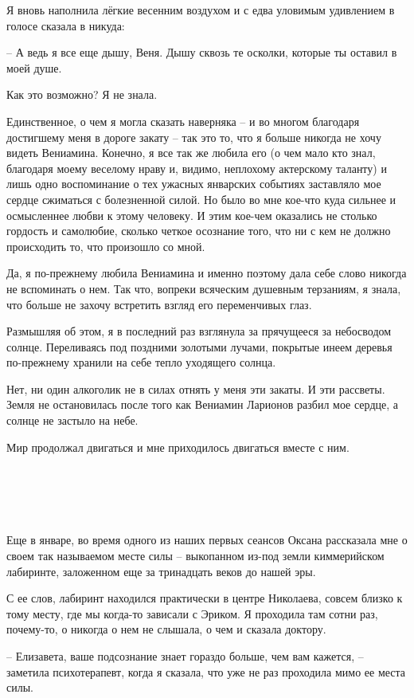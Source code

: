 \documentclass[
]{book}
\begin{document}
Я вновь наполнила лёгкие весенним воздухом и с едва уловимым удивлением в голосе сказала в никуда:

-- А ведь я все еще дышу, Веня. Дышу сквозь те осколки, которые ты оставил в моей душе.

Как это возможно? Я не знала.

Единственное, о чем я могла сказать наверняка -- и во многом благодаря достигшему меня в дороге закату -- так это то, что я больше никогда не хочу видеть Вениамина. Конечно, я все так же любила его (о чем мало кто знал, благодаря моему веселому нраву и, видимо, неплохому актерскому таланту) и лишь одно воспоминание о тех ужасных январских событиях заставляло мое сердце сжиматься с болезненной силой. Но было во мне кое-что куда сильнее и осмысленнее любви к этому человеку. И этим кое-чем оказались не столько гордость и самолюбие, сколько четкое осознание того, что ни с кем не должно происходить то, что произошло со мной.

Да, я по-прежнему любила Вениамина и именно поэтому дала себе слово никогда не вспоминать о нем. Так что, вопреки всяческим душевным терзаниям, я знала, что больше не захочу встретить взгляд его переменчивых глаз.

Размышляя об этом, я в последний раз взглянула за прячущееся за небосводом солнце. Переливаясь под поздними золотыми лучами, покрытые инеем деревья по-прежнему хранили на себе тепло уходящего солнца.

Нет, ни один алкоголик не в силах отнять у меня эти закаты. И эти рассветы. Земля не остановилась после того как Вениамин Ларионов разбил мое сердце, а солнце не застыло на небе.

Мир продолжал двигаться и мне приходилось двигаться вместе с ним.

\hypertarget{chapter-99}{%
\chapter{~}\label{chapter-99}}

Еще в январе, во время одного из наших первых сеансов Оксана рассказала мне о своем так называемом месте силы -- выкопанном из-под земли киммерийском лабиринте, заложенном еще за тринадцать веков до нашей эры.

С ее слов, лабиринт находился практически в центре Николаева, совсем близко к тому месту, где мы когда-то зависали с Эриком. Я проходила там сотни раз, почему-то, о никогда о нем не слышала, о чем и сказала доктору.

-- Елизавета, ваше подсознание знает гораздо больше, чем вам кажется, -- заметила психотерапевт, когда я сказала, что уже не раз проходила мимо ее места силы.
\end{document}
